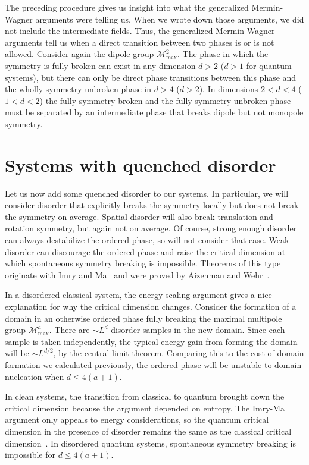 \documentclass[twocolumn, longbibliography]{revtex4-2}
\renewcommand{\max}{\text{max}}
\begin{document}
The preceding procedure gives us insight into what the generalized Mermin-Wagner arguments were telling us. When we wrote down those arguments, we did not include the intermediate fields. Thus, the generalized Mermin-Wagner arguments tell us when a direct transition between two phases is or is not allowed. Consider again the dipole group $\mathcal{M}^2_\max$. The phase in which the symmetry is fully broken can exist in any dimension $d>2$ ($d>1$ for quantum systems), but there can only be direct phase transitions between this phase and the wholly symmetry unbroken phase in $d>4$ ($d>2$). In dimensions $2<d<4$ ($1<d<2$) the fully symmetry broken and the fully symmetry unbroken phase must be separated by an intermediate phase that breaks dipole but not monopole symmetry. 

\section{Systems with quenched disorder} \label{sec:disord}

Let us now add some quenched disorder to our systems. In particular, we will consider disorder that explicitly breaks the symmetry locally but does not break the symmetry on average. Spatial disorder will also break translation and rotation symmetry, but again not on average. Of course, strong enough disorder can always destabilize the ordered phase, so will not consider that case. Weak disorder can discourage the ordered phase and raise the critical dimension at which spontaneous symmetry breaking is impossible. Theorems of this type originate with Imry and Ma~\cite{ImryMa} and were proved by Aizenman and Wehr~\cite{Aizenman}.

In a disordered classical system, the energy scaling argument gives a nice explanation for why the critical dimension changes. Consider the formation of a domain in an otherwise ordered phase fully breaking the maximal multipole group $\mathcal{M}^a_\max$. There are $\sim L^d$ disorder samples in the new domain. Since each sample is taken independently, the typical energy gain from forming the domain will be $\sim L^{d/2}$, by the central limit theorem. Comparing this to the cost of domain formation we calculated previously, the ordered phase will be unstable to domain nucleation when $d\le 4(a+1)$. 

In clean systems, the transition from classical to quantum brought down the critical dimension because the argument depended on entropy. The Imry-Ma argument only appeals to energy considerations, so the quantum critical dimension in the presence of disorder remains the same as the classical critical dimension~\cite{Vojta2013}. In disordered quantum systems, spontaneous symmetry breaking is impossible for $d\le 4(a+1)$.
\end{document}

